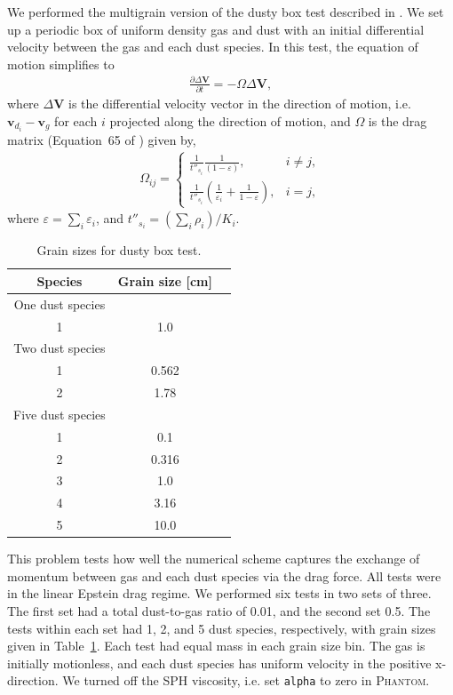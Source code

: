 \documentclass[fleqn,usenatbib]{mnras}
\let\vec\mathbf
\begin{document}
We performed the multigrain version of the dusty box test described in
\citet{Laibe2011MNRAS.418.1491L}. We set up a periodic box of uniform density
gas and dust with an initial differential velocity between the gas and each dust
species. In this test, the equation of motion simplifies to
%
\begin{align}
   \frac{\partial \Delta \vec{V}}{\partial t} = - \Omega \Delta \vec{V},
\end{align}
%
where \(\Delta \vec{V}\) is the differential velocity vector in the direction of
motion, i.e. \(\vec{v}_{d_i} - \vec{v}_g\) for each \(i\) projected along the
direction of motion, and \(\Omega\) is the drag matrix (Equation~65 of
\citet{Laibe2014MNRAS.444.1940L}) given by,
%
\begin{align}
   \Omega_{ij} =
   \begin{cases}
      \frac{1}{t''_{s_i}} \frac{1}{(1 - \varepsilon)}, &i \neq j,\\
      \frac{1}{t''_{s_i}} \left( \frac{1}{\varepsilon_i} +
         \frac{1}{1 - \varepsilon} \right), &i = j,
   \end{cases}
\end{align}
%
where \( \varepsilon = \sum_i \varepsilon_i \), and \( t''_{s_i} = \left( \sum_i
\rho_i \right) / K_i \).

\begin{table}
   \centering
   \begin{tabular}{ccc}
      \hline
      \hline
      Species & Grain size [cm] \\
      \hline
      \hline
      One dust species \\
      1 & 1.0 \\
      \hline
      Two dust species \\
      1 & 0.562 \\
      2 & 1.78 \\
      \hline
      Five dust species \\
      1 & 0.1 \\
      2 & 0.316 \\
      3 & 1.0 \\
      4 & 3.16 \\
      5 & 10.0 \\
      \hline
      \hline
   \end{tabular}
   \caption{Grain sizes for dusty box test.}%
   \label{tab:box}
\end{table}

This problem tests how well the numerical scheme captures the exchange of
momentum between gas and each dust species via the drag force. All tests were in
the linear Epstein drag regime. We performed six tests in two sets of three. The
first set had a total dust-to-gas ratio of 0.01, and the second set 0.5. The
tests within each set had 1, 2, and 5 dust species, respectively, with grain
sizes given in Table~\ref{tab:box}. Each test had equal mass in each grain size
bin. The gas is initially motionless, and each dust species has uniform velocity
in the positive x-direction. We turned off the SPH viscosity, i.e. set
\texttt{alpha} to zero in \textsc{Phantom}.
\end{document}
